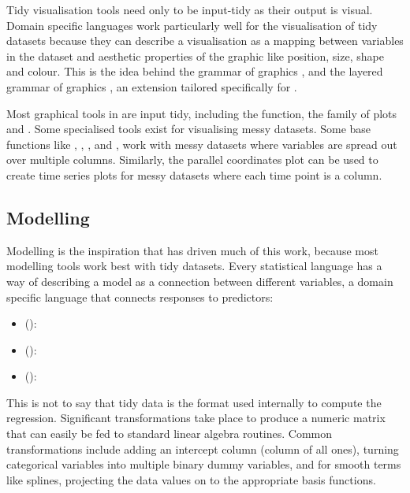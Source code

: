 \documentclass[article]{jss}
\begin{document}
Tidy visualisation tools need only to be input-tidy as their output is visual. Domain specific languages work particularly well for the visualisation of tidy datasets because they can describe a visualisation as a mapping between variables in the dataset and aesthetic properties of the graphic like position, size, shape and colour. This is the idea behind the grammar of graphics \citep{wilkinson:2006}, and the layered grammar of graphics \citep{wickham:2007d}, an extension tailored specifically for .

Most graphical tools in  are input tidy, including the   function, the  family of plots \citep{sarkar:2008} and  \citep{me:ggplot2}. Some specialised tools exist for visualising messy datasets. Some base  functions like , , , and , work with messy datasets where variables are spread out over multiple columns. Similarly, the parallel coordinates plot \citep{wegman:1990,inselberg:1985} can be used to create time series plots for messy datasets where each time point is a column.

\subsection{Modelling}
\label{sub:modelling}

Modelling is the inspiration that has driven much of this work, because most modelling tools work best with tidy datasets. Every statistical language has a way of describing a model as a connection between different variables, a domain specific language that connects responses to predictors: 

\begin{itemize}

  \item {} (): 

  \item {} (): 

  \item {} (): 

\end{itemize}

This is not to say that tidy data is the format used internally to compute the regression. Significant transformations take place to produce a numeric matrix that can easily be fed to standard linear algebra routines. Common transformations include adding an intercept column (column of all ones), turning categorical variables into multiple binary dummy variables, and for smooth terms like splines, projecting the data values on to the appropriate basis functions.
\end{document}
